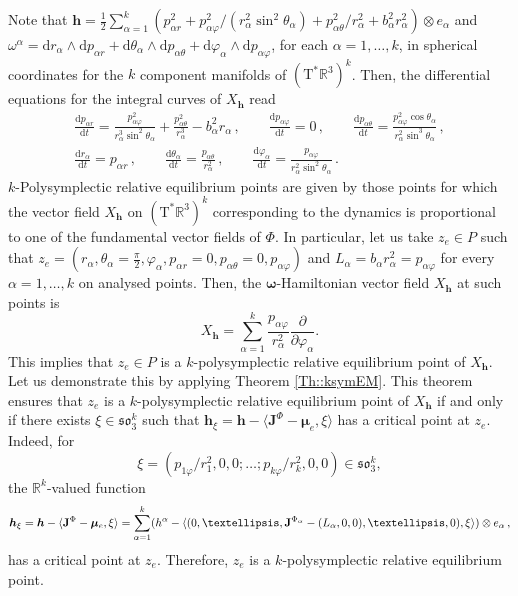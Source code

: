 \documentclass[11pt]{article}
\theoremstyle{plain}
\theoremstyle{definition}
\newcommand{\R}{\mathbb{R}}
\newcommand{\cT}{\mathrm{T}^\ast}
\newcommand{\bomega}{{\boldsymbol{\omega}}}
\newcommand{\bh}{{\boldsymbol{h}}}
\renewcommand{\d}{\mathrm{d}}
\def\d{\mathrm{d}}
\numberwithin{equation}{section}
\begin{document}
Note that $\bm h=\frac 12\sum_{\alpha=1}^k(p_{\alpha r}^2+p_{\alpha \varphi}^2/(r_\alpha^2\sin^2 \theta_\alpha)+p_{\alpha \theta}^2/r_\alpha^2+b_\alpha^2r_\alpha ^2)\otimes e_\alpha$ and $\omega^\alpha=\d r_\alpha\wedge \d p_{\alpha r}+\d \theta_\alpha\wedge \d p_{\alpha\theta}+\d\varphi_\alpha\wedge \d p_{\alpha\varphi}$, for each $\alpha=1,\ldots,k$, in spherical coordinates for the $k$ component manifolds of $(\cT \mathbb{R}^3)^k$. Then, the differential equations for the integral curves of $X_{\bm h}$  read
\begin{equation}\label{eq:SysBezRed}
\begin{gathered}
\frac{\d p_{\alpha r}}{\d t}=\frac{p_{\alpha  \varphi}^2}{r_\alpha ^3\sin^2\theta_\alpha }+\frac{p_{\alpha \theta}^2}{r_\alpha ^3}-b^2_\alpha r_\alpha \,,\qquad \frac{\d p_{\alpha \varphi}}{\d t}=0\,,\qquad 
\frac{\d p_{\alpha \theta}}{\d t}=\frac{p_{\alpha \varphi}^2\cos\theta_\alpha }{r_\alpha^2\sin^3
\theta_\alpha}\,,\\ \frac{\d r_\alpha}{\d t} = p_{\alpha r}\,,\qquad   \frac{\d \theta_\alpha}{\d t}=\frac{p_{\alpha\theta}}{r_\alpha^2}\,,\qquad \frac{\d\varphi_{\alpha}}{\d t} = \frac{p_{\alpha\varphi }}{r_\alpha^2\sin^2\theta_\alpha}\,.
\end{gathered}
\end{equation}
$k$-Polysymplectic relative equilibrium points are given by those points for which the vector field $X_{\bm h}$ on $(\cT \mathbb{R}^3)^k$ corresponding to the dynamics is proportional to one of the fundamental vector fields of $\Phi$. In particular, let us take $z_e\in P$ such that $z_e=(r_{\alpha},\theta_\alpha\!\!=\!\!\frac{\pi}{2},\varphi_\alpha,p_{\alpha r}\!\!=\!\!0,p_{\alpha\theta}=0,p_{\alpha\varphi})$ and $L_\alpha=b_\alpha r^2_\alpha=p_{\alpha \varphi}$ for every $\alpha=1,\ldots,k$ on analysed points. Then, the $\bomega$-Hamiltonian vector field $X_{\bh}$ at such points is
\[
    X_{\bm h}=\sum_{\alpha=1}^k\frac{p_{\alpha\varphi}}{r_\alpha^2}\frac{\partial}{\partial \varphi_{\alpha}}.
\]
This implies that $z_e\in P$ is a $k$-polysymplectic relative equilibrium point of $X_{\bh}$. 
Let us demonstrate this by
applying Theorem \ref{Th::ksymEM}. This theorem ensures that $z_e$ is a $k$-polysymplectic relative equilibrium point of $X_{\bh}$ if and only if there exists $\xi\in \mathfrak{so}_3^k$ such that $\boldsymbol{h}_{\xi}=\bh-\langle \mathbf{J}^\Phi-\boldsymbol{\mu}_e,\xi\rangle $ has a critical point at $z_e$. Indeed, for 
\[
\xi=(p_{1\varphi}/r^2_1,0,0;\ldots;p_{k\varphi}/r^2_k,0,0)\in \mathfrak{so}_3^k,
\]
the $\R^k$-valued function
\[
\boldsymbol{h}_{\xi}=\boldsymbol{h}-\langle\mathbf{J}^\Phi-\boldsymbol{\mu}_e ,\xi\rangle=\sum_{\alpha=1}^k(h^\alpha-\langle (0,\ldots,{\bf J}^{\Phi_\alpha}-(L_\alpha,0,0),\ldots,0),\xi \rangle)\otimes e_\alpha\,,
\]
has a critical point at $z_e$. Therefore, $z_e$ is a $k$-polysymplectic relative equilibrium point.
\end{document}
